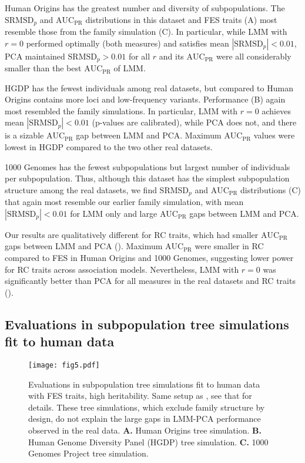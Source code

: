 \documentclass[9pt,lineno]{elife}
\newcommand{\rmsd}{\text{SRMSD}_p}
\newcommand{\auc}{\text{AUC}_\text{PR}}
\begin{document}
Human Origins has the greatest number and diversity of subpopulations.
The $\rmsd$ and $\auc$ distributions in this dataset and FES traits (A) most resemble those from the family simulation (C).
In particular, while LMM with $r=0$ performed optimally (both measures) and satisfies mean $|\rmsd| < 0.01$, PCA maintained $\rmsd > 0.01$ for all $r$ and its $\auc$ were all considerably smaller than the best $\auc$ of LMM.

HGDP has the fewest individuals among real datasets, but compared to Human Origins contains more loci and low-frequency variants.
Performance (B) again most resembled the family simulations.
In particular, LMM with $r=0$ achieves mean $|\rmsd| < 0.01$ (p-values are calibrated), while PCA does not, and there is a sizable $\auc$ gap between LMM and PCA.
Maximum $\auc$ values were lowest in HGDP compared to the two other real datasets.

1000 Genomes has the fewest subpopulations but largest number of individuals per subpopulation.
Thus, although this dataset has the simplest subpopulation structure among the real datasets, we find $\rmsd$ and $\auc$ distributions (C) that again most resemble our earlier family simulation, with mean $|\rmsd| < 0.01$ for LMM only and large $\auc$ gaps between LMM and PCA.

Our results are qualitatively different for RC traits, which had smaller $\auc$ gaps between LMM and PCA ().
Maximum $\auc$ were smaller in RC compared to FES in Human Origins and 1000 Genomes, suggesting lower power for RC traits across association models.
Nevertheless, LMM with $r=0$ was significantly better than PCA for all measures in the real datasets and RC traits ().

\subsection{Evaluations in subpopulation tree simulations fit to human data}

\begin{figure}
  \begin{fullwidth}
    \texttt{[image: fig5.pdf]}
    \caption{
      Evaluations in subpopulation tree simulations fit to human data with FES traits, high heritability.
      Same setup as , see that for details.
      These tree simulations, which exclude family structure by design, do not explain the large gaps in LMM-PCA performance observed in the real data.
      \textbf{A.}
      Human Origins tree simulation.
      \textbf{B.}
      Human Genome Diversity Panel (HGDP) tree simulation.
      \textbf{C.}
      1000 Genomes Project tree simulation.
    }
    \label{fig:rmsd-auc-real-sim}
    \label{figsupp:rmsd-auc-real-sim-rc}
  \end{fullwidth}
\end{figure}
\end{document}
